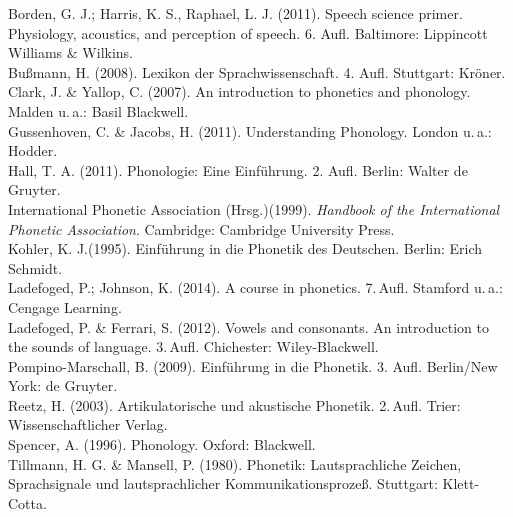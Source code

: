 \documentclass[11pt]{book}
\begin{document}
Borden, G. J.; Harris, K. S., Raphael, L. J. (2011). Speech science primer. Physiology, acoustics, and perception of speech. 6. Aufl. Baltimore: Lippincott Williams \& Wilkins. \newline\\
Bußmann, H. (2008). Lexikon der Sprachwissenschaft. 4. Aufl. Stuttgart: Kröner. \newline\\
Clark, J. \& Yallop, C. (2007). An introduction to phonetics and phonology. Malden u.\,a.:  Basil Blackwell.\newline\\
Gussenhoven, C. \& Jacobs, H. (2011). Understanding Phonology. London  u.\,a.: Hodder.\newline\\
Hall, T. A. (2011). Phonologie: Eine Einführung. 2. Aufl. Berlin: Walter de Gruyter. \newline\\
International Phonetic Association (Hrsg.)(1999). \textit{Handbook of the International Phonetic Association}. Cambridge: Cambridge University Press. \newline\\
Kohler, K. J.(1995). Einführung in die Phonetik des Deutschen. Berlin: Erich Schmidt. \newline\\
Ladefoged, P.; Johnson, K.  (2014). A course in phonetics. 7.\,Aufl. Stamford u.\,a.: Cengage Learning. \newline\\
Ladefoged, P. \& Ferrari, S. (2012). Vowels and consonants. An introduction to the sounds of language. 3.\,Aufl. Chichester: Wiley-Blackwell. \newline\\
Pompino-Marschall, B. (2009). Einführung in die Phonetik. 3. Aufl. Berlin/New York: de Gruyter.  \newline\\
Reetz, H. (2003). Artikulatorische und akustische Phonetik. 2.\,Aufl. Trier: Wissenschaftlicher Verlag.  \newline\\
Spencer, A. (1996). Phonology. Oxford: Blackwell.\newline\\
Tillmann, H. G. \& Mansell, P. (1980). Phonetik: Lautsprachliche Zeichen, Sprachsignale und lautsprachlicher Kommunikationsprozeß. Stuttgart: Klett-Cotta. \newline\\
\end{document}
